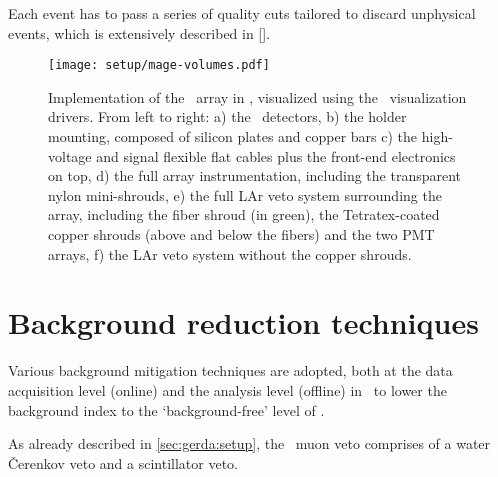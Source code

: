 Each event has to pass a series of quality cuts tailored to discard unphysical events,
which is extensively described in [\fillme].

\begin{figure}
  \centering
  \texttt{[image: setup/mage-volumes.pdf]}
  \caption{%
    Implementation of the \gerda\ array in \mage, visualized using the
    \geant\ visualization drivers. From left to right: a) the \gerda\
    detectors, b) the holder mounting, composed of silicon plates and
    copper bars c) the high-voltage and signal flexible flat cables plus
    the front-end electronics on top, d) the full array instrumentation,
    including the transparent nylon mini-shrouds, e) the full LAr veto
    system surrounding the array, including the fiber shroud (in green),
    the Tetratex\reg-coated copper shrouds (above and below the fibers) and
    the two PMT arrays, f) the LAr veto system without the copper
    shrouds.%
  }\label{fig:setup:magevolumes}
\end{figure}

\section{Background reduction techniques}\label{sec:gerda:cuts}

Various background mitigation techniques are adopted, both at the data acquisition level
(online) and the analysis level (offline) in \gerda\ to lower the background index to the
`background-free' level of \pIIbi.

As already described in \cref{sec:gerda:setup}, the \gerda\ muon veto comprises of a water
\v{C}erenkov veto and a scintillator veto.

